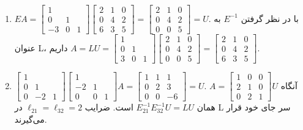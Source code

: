 \documentclass[12pt,a4paper]{article}
\begin{document}
{\begin{enumerate}
			\item $EA = \begin{bmatrix} 1 & & \\ 0 & 1 & \\ -3 & 0 & 1 \end{bmatrix} \begin{bmatrix} 2 & 1 & 0 \\ 0 & 4 & 2 \\ 6 & 3 & 5 \end{bmatrix} = \begin{bmatrix} 2 & 1 & 0 \\ 0 & 4 & 2 \\ 0 & 0 & 5 \end{bmatrix} = U$. با در نظر گرفتن $E^{-1}$ به عنوان L، داریم $A=LU = \begin{bmatrix} 1 & & \\ 0 & 1 & \\ 3 & 0 & 1 \end{bmatrix} \begin{bmatrix} 2 & 1 & 0 \\ 0 & 4 & 2 \\ 0 & 0 & 5 \end{bmatrix} = \begin{bmatrix} 2 & 1 & 0 \\ 0 & 4 & 2 \\ 6 & 3 & 5 \end{bmatrix}$.
			
			\item $\begin{bmatrix} 1 & & \\ 0 & 1 & \\ 0 & -2 & 1 \end{bmatrix} \begin{bmatrix} 1 & & \\ -2 & 1 & \\ 0 & 0 & 1 \end{bmatrix} A = \begin{bmatrix} 1 & 1 & 1 \\ 0 & 2 & 3 \\ 0 & 0 & -6 \end{bmatrix} = U$. آنگاه $A = \begin{bmatrix} 1 & 0 & 0 \\ 2 & 1 & 0 \\ 0 & 2 & 1 \end{bmatrix} U$ همان $E_{21}^{-1}E_{32}^{-1}U = LU$ است. ضرایب $\ell_{21}=\ell_{32}=2$ در L سر جای خود قرار می‌گیرند.
		\end{enumerate}
		
}
\end{document}
